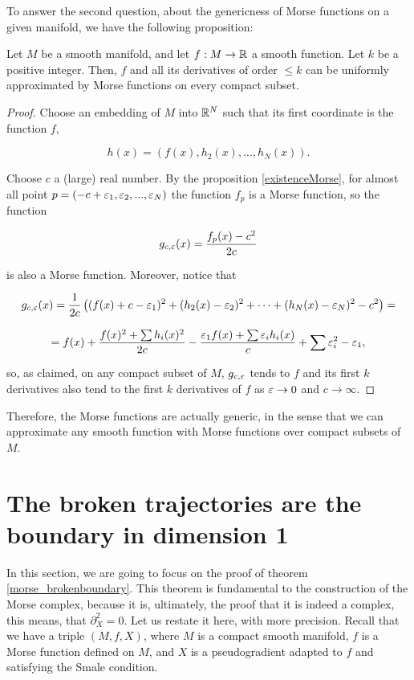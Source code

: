 To answer the second question, about the genericness of Morse functions on a given manifold, we have the following proposition:

\begin{prop} \label{proposition:morse_generic}
Let $M$ be a smooth manifold, and let $f : M \rightarrow \mathbb{R}$ a smooth function. Let $k$ be a positive integer. Then, $f$ and all its derivatives of order $\leq k$ can be uniformly approximated by Morse functions on every compact subset.
\end{prop}

\begin{proof}
Choose an embedding of $M$ into $\mathbb{R}^N$ such that its first coordinate is the function $f$,

\begin{displaymath}
h(x) = (f(x),h_2(x),...,h_N(x)) .
\end{displaymath}

Choose $c$ a (large) real number. By the proposition \ref{existenceMorse}, for almost all point $p = (-c+\varepsilon_1,\varepsilon_2,...,\varepsilon_N)$ the function $f_p$ is a Morse function, so the function

\[g_{c,\varepsilon}(x) = \frac{f_p(x)-c^2}{2c}\]

is also a Morse function. Moreover, notice that

\[g_{c,\varepsilon}(x) = \frac1{2c} \left((f(x) + c - \varepsilon_1)^2 + (h_2(x)-\varepsilon_2)^2 + \cdots + (h_N(x)-\varepsilon_N)^2 - c^2 \right) =\]

\[= f(x) + \frac{f(x)^2 + \sum h_i(x)^2}{2c} - \frac{\varepsilon_1f(x) + \sum \varepsilon_ih_i(x)}{c} + \sum \varepsilon_i^2 - \varepsilon_1 ,\]

so, as claimed, on any compact subset of $M$, $g_{c,\varepsilon}$ tends to $f$ and its first $k$ derivatives also tend to the first $k$ derivatives of $f$ as $\varepsilon \rightarrow 0$ and $c \rightarrow \infty$.
\end{proof}

Therefore, the Morse functions are actually generic, in the sense that we can approximate any smooth function with Morse functions over compact subsets of $M$.

\section{The broken trajectories are the boundary in dimension 1} \label{appendix:brokenboundary}

In this section, we are going to focus on the proof of theorem \ref{morse_brokenboundary}. This theorem is fundamental to the construction of the Morse complex, because it is, ultimately, the proof that it is indeed a complex, this means, that $\partial_X^2 = 0$. Let us restate it here, with more precision. Recall that we have a triple $(M, f, X)$, where $M$ is a compact smooth manifold, $f$ is a Morse function defined on $M$, and $X$ is a pseudogradient adapted to $f$ and satisfying the Smale condition.

